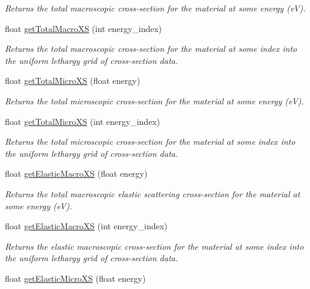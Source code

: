 \begin{DoxyCompactItemize}
\begin{DoxyCompactList}\small\item\em Returns the total macroscopic cross-\/section for the material at some energy (e\-V). \end{DoxyCompactList}\item 
float \hyperlink{classMaterial_a29d36e8d41af9cbc254bb31edbc06d53}{get\-Total\-Macro\-X\-S} (int energy\-\_\-index)
\begin{DoxyCompactList}\small\item\em Returns the total macroscopic cross-\/section for the material at some index into the uniform lethargy grid of cross-\/section data. \end{DoxyCompactList}\item 
float \hyperlink{classMaterial_a03326f0dddaf1affd6395c075f5ccf9f}{get\-Total\-Micro\-X\-S} (float energy)
\begin{DoxyCompactList}\small\item\em Returns the total microscopic cross-\/section for the material at some energy (e\-V). \end{DoxyCompactList}\item 
float \hyperlink{classMaterial_ae3ab3e334dbf390c2c60f048b679a348}{get\-Total\-Micro\-X\-S} (int energy\-\_\-index)
\begin{DoxyCompactList}\small\item\em Returns the total microscopic cross-\/section for the material at some index into the uniform lethargy grid of cross-\/section data. \end{DoxyCompactList}\item 
float \hyperlink{classMaterial_a2bad3888c55b8a5ab7260f459b49200c}{get\-Elastic\-Macro\-X\-S} (float energy)
\begin{DoxyCompactList}\small\item\em Returns the total macroscopic elastic scattering cross-\/section for the material at some energy (e\-V). \end{DoxyCompactList}\item 
float \hyperlink{classMaterial_abfa583941d2611f3f1a73dee015551e9}{get\-Elastic\-Macro\-X\-S} (int energy\-\_\-index)
\begin{DoxyCompactList}\small\item\em Returns the elastic macroscopic cross-\/section for the material at some index into the uniform lethargy grid of cross-\/section data. \end{DoxyCompactList}\item 
float \hyperlink{classMaterial_a35e410264efd36f267fac02719bab902}{get\-Elastic\-Micro\-X\-S} (float energy)

\end{DoxyCompactItemize}
